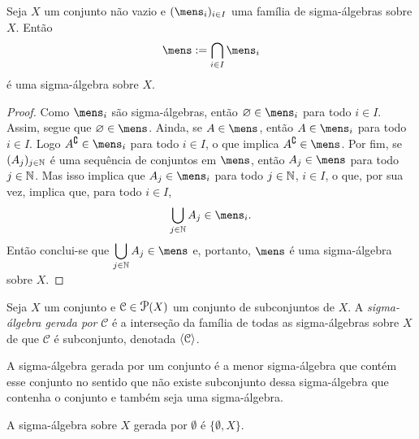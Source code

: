 \begin{prop}
Seja $X$ um conjunto não vazio e $(\mens_i)_{i \in I}$ uma família de sigma-álgebras sobre $X$. Então
	\begin{equation*}
	\mens := \bigcap_{i \in I} \mens_i
	\end{equation*}
é uma sigma-álgebra sobre $X$.
\end{prop}
\begin{proof}
	Como $\mens_i$ são sigma-álgebras, então $\emptyset \in \mens_i$ para todo $i \in I$. Assim, segue que $\emptyset \in \mens$. Ainda, se $A \in \mens$, então $A \in \mens_i$ para todo $i \in I$. Logo $A^\complement \in \mens_i$ para todo $i \in I$, o que implica $A^\complement \in \mens$. Por fim, se $(A_j)_{j \in \mathbb{N}}$ é uma sequência de conjuntos em $\mens$, então $A_j \in \mens$ para todo $j \in \mathbb{N}$. Mas isso implica que $A_j \in \mens_i$ para todo $j \in \mathbb{N}$, $i \in I$, o que, por sua vez, implica que, para todo $i \in I$,
	\begin{equation*}
	\bigcup_{j \in \N} A_j \in \mens_i.
	\end{equation*}
Então conclui-se que $\displaystyle\bigcup_{j \in \N} A_j \in \mens$ e, portanto, $\mens$ é uma sigma-álgebra sobre $X$.
\end{proof}

\begin{defi}
Seja $X$ um conjunto e $\mathcal C \in \p(X)$ um conjunto de subconjuntos de $X$. A \emph{sigma-álgebra gerada por} $\mathcal C$ é a interseção da família de todas as sigma-álgebras sobre $X$ de que $\mathcal C$ é subconjunto, denotada $\left\langle \mathcal C \right\rangle$.
\end{defi}
	
	A sigma-álgebra gerada por um conjunto é a menor sigma-álgebra que contém esse conjunto no sentido que não existe subconjunto dessa sigma-álgebra que contenha o conjunto e também seja uma sigma-álgebra.

\begin{ex}
	A sigma-álgebra sobre $X$ gerada por $\emptyset$ é $\{\emptyset, X\}$.
\end{ex}



